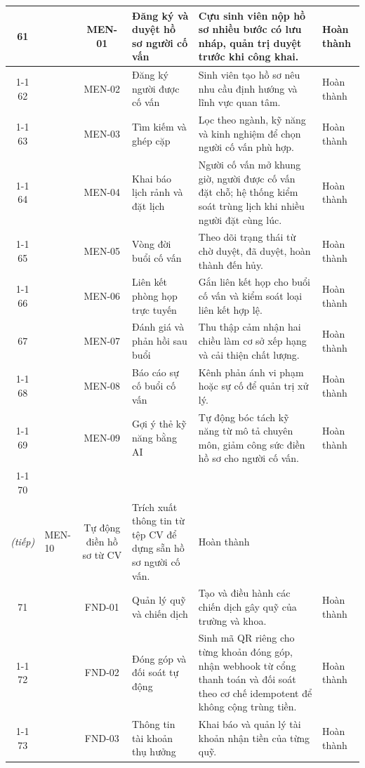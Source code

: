 \documentclass[12pt,a4paper,oneside]{report}
\begin{document}
\begin{landscape}
\begin{longtable}{|c|>{\raggedright\arraybackslash}p{3.1cm}|c|>{\raggedright\arraybackslash}p{4.6cm}|>{\raggedright\arraybackslash}p{8.4cm}|>{\raggedright\arraybackslash}p{2.4cm}|}
\hline
61 &  & MEN-01 & Đăng ký và duyệt hồ sơ người cố vấn & Cựu sinh viên nộp hồ sơ nhiều bước có lưu nháp, quản trị duyệt trước khi công khai. & Hoàn thành \\
\cline{1-1}\cline{3-6}
62 &  & MEN-02 & Đăng ký người được cố vấn & Sinh viên tạo hồ sơ nêu nhu cầu định hướng và lĩnh vực quan tâm. & Hoàn thành \\
\cline{1-1}\cline{3-6}
63 &  & MEN-03 & Tìm kiếm và ghép cặp & Lọc theo ngành, kỹ năng và kinh nghiệm để chọn người cố vấn phù hợp. & Hoàn thành \\
\cline{1-1}\cline{3-6}
64 &  & MEN-04 & Khai báo lịch rảnh và đặt lịch & Người cố vấn mở khung giờ, người được cố vấn đặt chỗ; hệ thống kiểm soát trùng lịch khi nhiều người đặt cùng lúc. & Hoàn thành \\
\cline{1-1}\cline{3-6}
65 &  & MEN-05 & Vòng đời buổi cố vấn & Theo dõi trạng thái từ chờ duyệt, đã duyệt, hoàn thành đến hủy. & Hoàn thành \\
\cline{1-1}\cline{3-6}
66 & \multirow{-6}{2.4cm}{\textbf{Cố vấn}} & MEN-06 & Liên kết phòng họp trực tuyến & Gắn liên kết họp cho buổi cố vấn và kiểm soát loại liên kết hợp lệ. & Hoàn thành \\
\hline
67 &  & MEN-07 & Đánh giá và phản hồi sau buổi & Thu thập cảm nhận hai chiều làm cơ sở xếp hạng và cải thiện chất lượng. & Hoàn thành \\
\cline{1-1}\cline{3-6}
68 &  & MEN-08 & Báo cáo sự cố buổi cố vấn & Kênh phản ánh vi phạm hoặc sự cố để quản trị xử lý. & Hoàn thành \\
\cline{1-1}\cline{3-6}
69 &  & MEN-09 & Gợi ý thẻ kỹ năng bằng AI & Tự động bóc tách kỹ năng từ mô tả chuyên môn, giảm công sức điền hồ sơ cho người cố vấn. & Hoàn thành \\
\cline{1-1}\cline{3-6}
70 & \multirow{-4}{2.4cm}{\textbf{Cố vấn\\\textit{(tiếp)}}} & MEN-10 & Tự động điền hồ sơ từ CV & Trích xuất thông tin từ tệp CV để dựng sẵn hồ sơ người cố vấn. & Hoàn thành \\
\hline
71 &  & FND-01 & Quản lý quỹ và chiến dịch & Tạo và điều hành các chiến dịch gây quỹ của trường và khoa. & Hoàn thành \\
\cline{1-1}\cline{3-6}
72 &  & FND-02 & Đóng góp và đối soát tự động & Sinh mã QR riêng cho từng khoản đóng góp, nhận webhook từ cổng thanh toán và đối soát theo cơ chế idempotent để không cộng trùng tiền. & Hoàn thành \\
\cline{1-1}\cline{3-6}
73 &  & FND-03 & Thông tin tài khoản thụ hưởng & Khai báo và quản lý tài khoản nhận tiền của từng quỹ. & Hoàn thành \\

\end{longtable}
\end{landscape}
\end{document}
